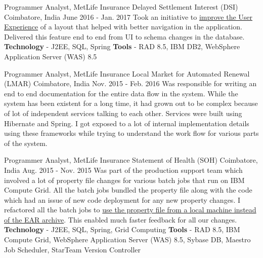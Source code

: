 \begin{cventries}
  \cventry
    {Programmer Analyst, MetLife Insurance} %
    {Delayed Settlement Interest (DSI)} %
    {Coimbatore, India} %
    {June 2016 - Jan. 2017} %
    {
        Took an initiative to \underline{improve the User Experience} of a layout that helped with better navigation in the application. Delivered this feature end to end from UI to schema changes in the database. 
        \newline
        \textbf{Technology} - J2EE, SQL, Spring \newline
        \textbf{Tools} - RAD 8.5, IBM DB2, WebSphere Application Server (WAS) 8.5
    }

  \cventry
    {Programmer Analyst, MetLife Insurance} %
    {Local Market for Automated Renewal (LMAR)} %
    {Coimbatore, India} %
    {Nov. 2015 - Feb. 2016} %
    {
        Was responsible for writing an end to end documentation for the entire data flow in the system. While the system has been existent for a long time, it had grown out to be complex because of lot of independent services talking to each other. Services were built using Hibernate and Spring. I got exposed to a lot of internal implementation details using these frameworks while trying to understand the work flow for various parts of the system.
    }

  \cventry
    {Programmer Analyst, MetLife Insurance} %
    {Statement of Health (SOH)} %
    {Coimbatore, India} %
    {Aug. 2015 - Nov. 2015} %
    {
        Was part of the production support team which involved a lot of property file changes for various batch jobs that run on IBM Compute Grid. All the batch jobs bundled the property file along with the code which had an issue of new code deployment for any new property changes. I refactored all the batch jobs to \underline{use the property file from a local machine instead of the EAR archive}. This enabled much faster feedback for all our changes.
        \newline
        \textbf{Technology} - J2EE, SQL, Spring, Grid Computing \newline
        \textbf{Tools} - RAD 8.5, IBM Compute Grid, WebSphere Application Server (WAS) 8.5, Sybase DB, Maestro Job Scheduler, StarTeam Version Controller
    }


\end{cventries}
